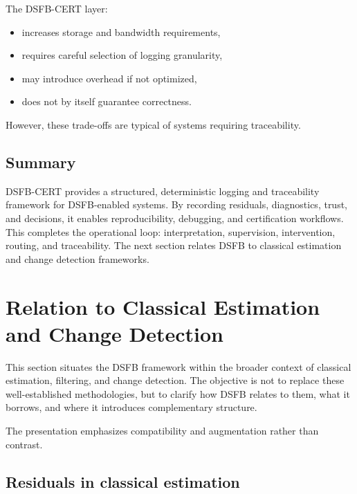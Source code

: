 \documentclass[11pt]{article}
\theoremstyle{definition}
\theoremstyle{plain}
\begin{document}
The DSFB-CERT layer:
\begin{itemize}[leftmargin=1.5em]
    \item increases storage and bandwidth requirements,
    \item requires careful selection of logging granularity,
    \item may introduce overhead if not optimized,
    \item does not by itself guarantee correctness.
\end{itemize}

However, these trade-offs are typical of systems requiring traceability.


\subsection{Summary}

DSFB-CERT provides a structured, deterministic logging and traceability framework for DSFB-enabled systems. By recording residuals, diagnostics, trust, and decisions, it enables reproducibility, debugging, and certification workflows. This completes the operational loop: interpretation, supervision, intervention, routing, and traceability. The next section relates DSFB to classical estimation and change detection frameworks.


\section{Relation to Classical Estimation and Change Detection}
\label{sec:classical}

This section situates the DSFB framework within the broader context of classical estimation, filtering, and change detection. The objective is not to replace these well-established methodologies, but to clarify how DSFB relates to them, what it borrows, and where it introduces complementary structure.

The presentation emphasizes compatibility and augmentation rather than contrast.


\subsection{Residuals in classical estimation}
\end{document}
